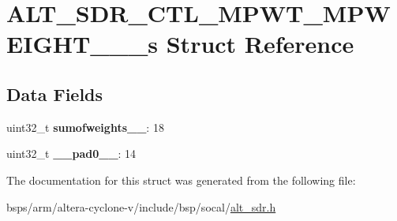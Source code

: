 \hypertarget{structALT__SDR__CTL__MPWT__MPWEIGHT__3__4__s}{}\section{A\+L\+T\+\_\+\+S\+D\+R\+\_\+\+C\+T\+L\+\_\+\+M\+P\+W\+T\+\_\+\+M\+P\+W\+E\+I\+G\+H\+T\+\_\+\_\+\_\+s Struct Reference}
\label{structALT__SDR__CTL__MPWT__MPWEIGHT__3__4__s}
\subsection*{Data Fields}
\begin{DoxyCompactItemize}
\item 
\mbox{\label{structALT__SDR__CTL__MPWT__MPWEIGHT__3__4__s_aee5bb3b8c49f47d4019355debb865e14}} 
uint32\+\_\+t {\bfseries sumofweights\+\_\+\_}\+: 18
\item 
\mbox{\label{structALT__SDR__CTL__MPWT__MPWEIGHT__3__4__s_ae4ab8df7f9b53a3b6c02d4b2a96ee343}} 
uint32\+\_\+t {\bfseries \+\_\+\+\_\+pad0\+\_\+\+\_\+}\+: 14
\end{DoxyCompactItemize}


The documentation for this struct was generated from the following file\+:\begin{DoxyCompactItemize}
\item 
bsps/arm/altera-\/cyclone-\/v/include/bsp/socal/\mbox{\hyperlink{alt__sdr_8h}{alt\+\_\+sdr.\+h}}\end{DoxyCompactItemize}
